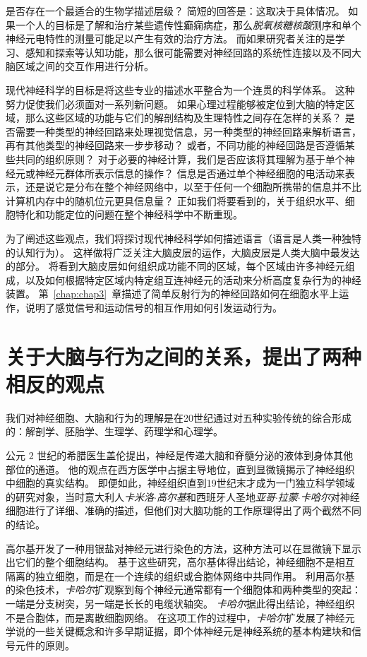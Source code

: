 是否存在一个最适合的生物学描述层级？
简短的回答是：这取决于具体情况。
如果一个人的目标是了解和治疗某些遗传性癫痫病症，那么\textit{脱氧核糖核酸}测序和单个神经元电特性的测量可能足以产生有效的治疗方法。
而如果研究者关注的是学习、感知和探索等认知功能，那么很可能需要对神经回路的系统性连接以及不同大脑区域之间的交互作用进行分析。


现代神经科学的目标是将这些专业的描述水平整合为一个连贯的科学体系。
这种努力促使我们必须面对一系列新问题。
如果心理过程能够被定位到大脑的特定区域，那么这些区域的功能与它们的解剖结构及生理特性之间存在怎样的关系？
是否需要一种类型的神经回路来处理视觉信息，另一种类型的神经回路来解析语言，再有其他类型的神经回路来一步步移动？
或者，不同功能的神经回路是否遵循某些共同的组织原则？
对于必要的神经计算，我们是否应该将其理解为基于单个神经元或神经元群体所表示信息的操作？
信息是否通过单个神经细胞的电活动来表示，还是说它是分布在整个神经网络中，以至于任何一个细胞所携带的信息并不比计算机内存中的随机位元更具信息量？
正如我们将要看到的，关于组织水平、细胞特化和功能定位的问题在整个神经科学中不断重现。


为了阐述这些观点，我们将探讨现代神经科学如何描述语言（语言是人类一种独特的认知行为）。
这样做将广泛关注大脑皮层的运作，大脑皮层是人类大脑中最发达的部分。
将看到大脑皮层如何组织成功能不同的区域，每个区域由许多神经元组成，以及如何根据特定区域内特定组互连神经元的活动来分析高度复杂行为的神经装置。
第~\ref{chap:chap3}~章描述了简单反射行为的神经回路如何在细胞水平上运作，说明了感觉信号和运动信号的相互作用如何引发运动行为。



\section{关于大脑与行为之间的关系，提出了两种相反的观点}

我们对神经细胞、大脑和行为的理解是在20世纪通过对五种实验传统的综合形成的：解剖学、胚胎学、生理学、药理学和心理学。


公元 2 世纪的希腊医生盖伦提出，神经是传递大脑和脊髓分泌的液体到身体其他部位的通道。
他的观点在西方医学中占据主导地位，直到显微镜揭示了神经组织中细胞的真实结构。
即便如此，神经组织直到19世纪末才成为一门独立科学领域的研究对象，当时意大利人\textit{卡米洛$\cdot$高尔基}和西班牙人圣地\textit{亚哥$\cdot$拉蒙$\cdot$卡哈尔}对神经细胞进行了详细、准确的描述，但他们对大脑功能的工作原理得出了两个截然不同的结论。


高尔基开发了一种用银盐对神经元进行染色的方法，这种方法可以在显微镜下显示出它们的整个细胞结构。
基于这些研究，高尔基体得出结论，神经细胞不是相互隔离的独立细胞，而是在一个连续的组织或合胞体网络中共同作用。
利用高尔基的染色技术，\textit{卡哈尔}扩观察到每个神经元通常都有一个细胞体和两种类型的突起：一端是分支树突，另一端是长长的电缆状轴突。 
\textit{卡哈尔}据此得出结论，神经组织不是合胞体，而是离散细胞网络。
在这项工作的过程中，\textit{卡哈尔}扩发展了神经元学说的一些关键概念和许多早期证据，即个体神经元是神经系统的基本构建块和信号元件的原则。



